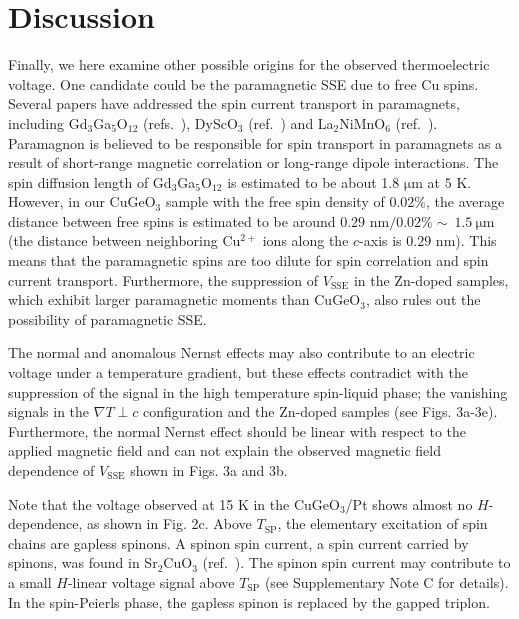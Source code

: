 \documentclass{nature}
\begin{document}
\section*{Discussion}
Finally, we here examine other possible origins for the observed thermoelectric voltage. 
One candidate could be the paramagnetic SSE due to free Cu spins. 
Several papers have addressed the spin current transport in paramagnets, including Gd$_3$Ga$_5$O$_{12}$ (refs.~\cite{Wu:2015gf,Oyanagi:2019cv}), DyScO$_3$ (ref.~\cite{Wu:2015gf}) and La$_2$NiMnO$_6$ (ref.~\cite{Shiomi:2014gd}). 
Paramagnon is believed to be responsible for spin transport in paramagnets as a result of short-range magnetic correlation or long-range dipole interactions.
 The spin diffusion length of Gd$_3$Ga$_5$O$_{12}$ is estimated to be about 1.8 $\mathrm{\mu m}$ at $5$ K\cite{Oyanagi:2019cv}. 
 However, in our CuGeO$_3$ sample with the free spin density of $0.02\%$, the average distance between free spins is estimated to be around $0.29$ nm$/0.02\% \sim\ 1.5\ \mathrm{\mu m}$ (the distance between neighboring Cu$^{2+}$ ions along the $c$-axis is $0.29$ nm\cite{Kamimura:1994fe}).
  This means that the paramagnetic spins are too dilute for spin correlation and spin current transport. 
Furthermore, the suppression of $V_{\mathrm{SSE}}$ in the 
Zn-doped samples, which exhibit larger paramagnetic moments than CuGeO$_3$, also rules out the possibility of paramagnetic SSE.


\par 



The normal and anomalous Nernst effects may also contribute to an electric voltage under a temperature gradient, but these effects contradict with the suppression 
of the signal in the high temperature spin-liquid phase; the vanishing signals in the $\nabla T \perp c$ configuration and the Zn-doped samples (see Figs. 3a-3e).
Furthermore, the normal Nernst effect should be linear with respect to the applied magnetic field and can not explain the observed magnetic field dependence of $V_{\mathrm{SSE}}$ shown in Figs. 3a and 3b.

\par 



Note that the voltage observed at 15 K in the CuGeO$_3$/Pt shows almost no $H$-dependence, as shown in Fig. 2c. 
Above $T_{\mathrm{SP}}$, the elementary excitation of spin chains are gapless spinons\cite{Bonner:1982bs}. 
A spinon spin current, a spin current carried by spinons, was found in Sr$_2$CuO$_3$ (ref.~\cite{Hirobe:2016eg}).
The spinon spin current may contribute to a small $H$-linear voltage signal above $T_{\mathrm{SP}}$ (see Supplementary Note C for details). In the spin-Peierls phase, the gapless spinon is replaced by the gapped triplon\cite{Bonner:1982bs}.
\end{document}
